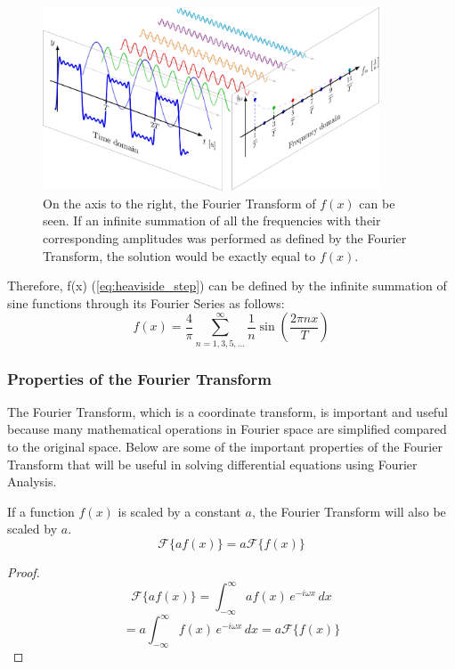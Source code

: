 \begin{figure}[H]
    \centering
    \includegraphics[width=100mm,height=\textheight,keepaspectratio]{images/step_function_fourier_series.png}
    \caption{On the axis to the right, the Fourier Transform of \(f(x)\) can be seen. If an infinite summation of all the frequencies with their corresponding amplitudes was performed as defined by the Fourier Transform, the solution would be exactly equal to \(f(x)\).}
    \label{fig:decomposed_step_function}
\end{figure}

Therefore, f(x) (\cref{eq:heaviside_step}) can be defined by the infinite summation of sine functions through its Fourier Series as follows: 
\[f(x)=\frac{4}{\pi}\sum_{n=1,3,5,...}^{\infty} \frac{1}{n} \sin \left( \frac{2 \pi n x}{T}
 \right) \]

\subsubsection{Properties of the Fourier Transform}
The Fourier Transform, which is a coordinate transform, is important and useful because many mathematical operations in Fourier space are simplified compared to the original space. Below are some of the important properties of the Fourier Transform that will be useful in solving differential equations using Fourier Analysis.
\begin{lemma}
    \label{fourier_scaling}
    If a function \(f(x)\) is scaled by a constant $a$, the Fourier Transform will also be scaled by $a$.
    \begin{equation}
        \mathcal{F}\{ a f(x) \} = a \mathcal{F}\{ f(x) \}
    \end{equation}
\end{lemma}

\begin{proof}
    \[ \mathcal{F}\{ a f(x) \} = \int_{-\infty}^{\infty} a f(x) \, e^{-i \omega x} \,dx \]
    \[ = a \int_{-\infty}^{\infty} f(x) \, e^{-i \omega x} \,dx = a \mathcal{F}\{ f(x) \} \]
\end{proof}

